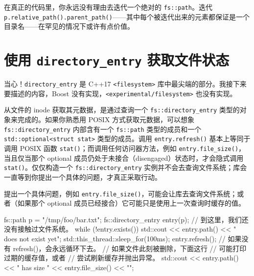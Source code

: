 在真正的代码里，你永远没有理由去迭代一个绝对的 \texttt{fs::\allowbreak{}path}。迭代 \texttt{p.\allowbreak{}relative\_\allowbreak{}path(\allowbreak{})\allowbreak{}.parent\_\allowbreak{}path(\allowbreak{})\allowbreak{}}——其中每个被迭代出来的元素都保证是一个目录名——在罕见的情况下或许有点价值。

\section{使用 \texttt{directory\_\allowbreak{}entry} 获取文件状态}

当心！\texttt{directory\_\allowbreak{}entry} 是 C++17 \texttt{<filesystem>\allowbreak{}} 库中最尖端的部分。我接下来要描述的内容，Boost 没有实现，\texttt{<experimental/\allowbreak{}filesystem>\allowbreak{}} 也没有实现。

从文件的 inode 获取其元数据，是通过查询一个 \texttt{fs::\allowbreak{}directory\_\allowbreak{}entry} 类型的对象来完成的。如果你熟悉用 POSIX 方式获取元数据，可以想象 \texttt{fs::\allowbreak{}directory\_\allowbreak{}entry} 内部含有一个 \texttt{fs::\allowbreak{}path} 类型的成员和一个 \texttt{std::\allowbreak{}optional<\allowbreak{}struct stat>\allowbreak{}} 类型的成员。调用 \texttt{entry.\allowbreak{}refresh(\allowbreak{})\allowbreak{}} 基本上等同于调用 POSIX 函数 \texttt{stat(\allowbreak{})\allowbreak{}}；而调用任何访问器方法，例如 \texttt{entry.\allowbreak{}file\_\allowbreak{}size(\allowbreak{})\allowbreak{}}，当且仅当那个 optional 成员仍处于未接合（disengaged）状态时，才会隐式调用 \texttt{stat(\allowbreak{})\allowbreak{}}。仅仅构造一个 \texttt{fs::\allowbreak{}directory\_\allowbreak{}entry} 实例并不会去查询文件系统；库会一直等到你提出一个具体的问题，才真正采取行动。

提出一个具体问题，例如 \texttt{entry.\allowbreak{}file\_\allowbreak{}size(\allowbreak{})\allowbreak{}}，可能会让库去查询文件系统；或者（如果那个 optional 成员已经接合）它可能只是使用上一次查询时缓存的值。

\begin{codebox}[cpp]
    fs::path p = "/tmp/foo/bar.txt";
    fs::directory_entry entry(p);
      // 到这里，我们还没有接触过文件系统。
    while (!entry.exists()) {
       std::cout << entry.path() << " does not exist yet\n";
       std::this_thread::sleep_for(100ms);
       entry.refresh();
         // 如果没有 refresh()，会永远循环下去。
    }
      // 如果文件此刻被删除，下面这行
      // 可能打印过期的缓存值，或者
      // 尝试刷新缓存并抛出异常。
    std::cout << entry.path() << " has size "
          << entry.file_size() << "\n";
\end{codebox}

